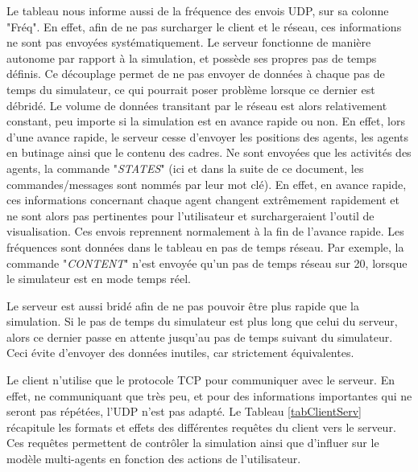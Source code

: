 	Le tableau nous informe aussi de la fréquence des envois UDP, sur sa colonne "Fréq". En effet, afin de ne pas surcharger le client et le réseau, ces informations ne sont pas envoyées systématiquement. Le serveur fonctionne de manière autonome par rapport à la simulation, et possède ses propres pas de temps définis. Ce découplage permet de ne pas envoyer de données à chaque pas de temps du simulateur, ce qui pourrait poser problème lorsque ce dernier est débridé. Le volume de données transitant par le réseau est alors relativement constant, peu importe si la simulation est en avance rapide ou non. En effet, lors d'une avance rapide, le serveur cesse d'envoyer les positions des agents, les agents en butinage ainsi que le contenu des cadres. Ne sont envoyées que les activités des agents, la commande "\textit{STATES}" (ici et dans la suite de ce document, les commandes/messages sont nommés par leur mot clé). En effet, en avance rapide, ces informations concernant chaque agent changent extrêmement rapidement et ne sont alors pas pertinentes pour l'utilisateur et surchargeraient l'outil de visualisation. Ces envois reprennent normalement à la fin de l'avance rapide.
	Les fréquences sont données dans le tableau en pas de temps réseau. Par exemple, la commande "\textit{CONTENT}" n'est envoyée qu'un pas de temps réseau sur 20, lorsque le simulateur est en mode temps réel. 
	
 	Le serveur est aussi bridé afin de ne pas pouvoir être plus rapide que la simulation. Si le pas de temps du simulateur est plus long que celui du serveur, alors ce dernier passe en attente jusqu'au pas de temps suivant du simulateur. Ceci évite d'envoyer des données inutiles, car strictement équivalentes.
	
	Le client n'utilise que le protocole TCP pour communiquer avec le serveur. En effet, ne communiquant que très peu, et pour des informations importantes qui ne seront pas répétées, l'UDP n'est pas adapté. Le Tableau \ref{tabClientServ} récapitule les formats et effets des différentes requêtes du client vers le serveur. Ces requêtes permettent de contrôler la simulation ainsi que d'influer sur le modèle multi-agents en fonction des actions de l'utilisateur.
	
